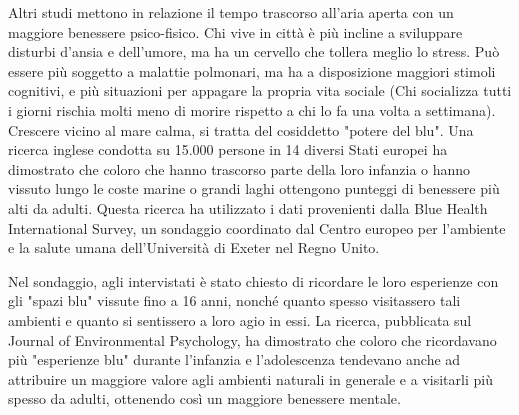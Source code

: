 \documentclass[12pt]{book} %
\begin{document}
\begin{mdframed}[linewidth=1pt]
Altri studi mettono in relazione il tempo trascorso all'aria aperta con un maggiore benessere psico-fisico. Chi vive in
città è più incline a sviluppare disturbi d'ansia e dell'umore, ma ha un cervello che tollera meglio lo stress. Può
essere più soggetto a malattie polmonari, ma ha a disposizione maggiori stimoli cognitivi, e più situazioni per
appagare la propria vita sociale (Chi socializza tutti i giorni rischia molti meno di morire rispetto a chi lo fa una
volta a settimana).
Crescere vicino al mare calma, si tratta del cosiddetto "potere del blu". Una ricerca inglese condotta su 15.000 persone in 14 diversi Stati europei ha dimostrato che coloro che hanno trascorso parte della loro infanzia o hanno vissuto lungo le coste marine o grandi laghi ottengono punteggi di benessere più alti da adulti. Questa ricerca ha utilizzato i dati provenienti dalla Blue Health International Survey, un sondaggio coordinato dal Centro europeo per l'ambiente e la salute umana dell'Università di Exeter nel Regno Unito.

Nel sondaggio, agli intervistati è stato chiesto di ricordare le loro esperienze con gli "spazi blu" vissute fino a 16 anni, nonché quanto spesso visitassero tali ambienti e quanto si sentissero a loro agio in essi. La ricerca, pubblicata sul Journal of Environmental Psychology, ha dimostrato che coloro che ricordavano più "esperienze blu" durante l'infanzia e l'adolescenza tendevano anche ad attribuire un maggiore valore agli ambienti naturali in generale e a visitarli più spesso da adulti, ottenendo così un maggiore benessere mentale.

\bigskip


\end{mdframed}
\end{document}
